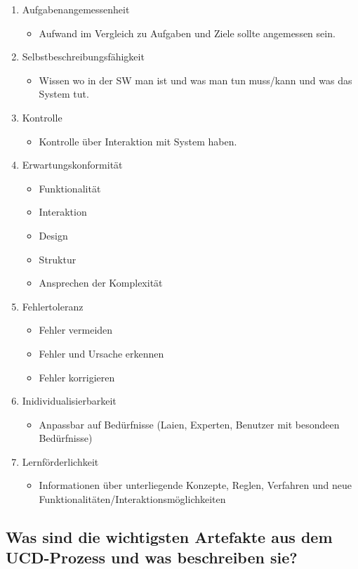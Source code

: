 \documentclass{article}
\begin{document}
\begin{enumerate}
	\item Aufgabenangemessenheit
	\begin{itemize}
		\item Aufwand im Vergleich zu Aufgaben und Ziele sollte angemessen sein.
	\end{itemize}
	\item Selbstbeschreibungsfähigkeit
		\begin{itemize}
		\item Wissen wo in der SW man ist und was man tun muss/kann und was das System tut.
	\end{itemize}
	\item Kontrolle
		\begin{itemize}
		\item Kontrolle über Interaktion mit System haben.
	\end{itemize}
	\item Erwartungskonformität
		\begin{itemize}
		\item Funktionalität
		\item Interaktion
		\item Design
		\item Struktur
		\item Ansprechen der Komplexität
	\end{itemize}
	\item Fehlertoleranz
		\begin{itemize}
		\item Fehler vermeiden
		\item Fehler und Ursache erkennen
		\item Fehler korrigieren
	\end{itemize}
	\item Inidividualisierbarkeit
		\begin{itemize}
		\item Anpassbar auf Bedürfnisse (Laien, Experten, Benutzer mit besondeen Bedürfnisse)
	\end{itemize}
	\item Lernförderlichkeit
		\begin{itemize}
		\item Informationen über unterliegende Konzepte, Reglen, Verfahren und neue Funktionalitäten/Interaktionsmöglichkeiten
	\end{itemize}
\end{enumerate}



\subsection{Was sind die wichtigsten Artefakte aus dem UCD-Prozess und was beschreiben sie?}
\end{document}
